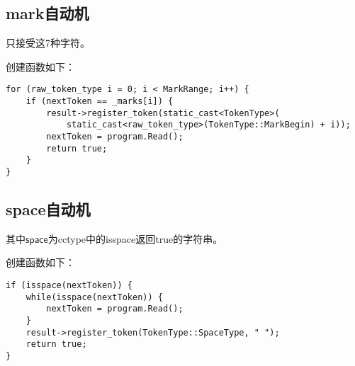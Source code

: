 \documentclass[UTF8]{ctexart}
\begin{document}
\subsection{mark自动机}
\begin{figure}[!h]
    \centering
\end{figure}
\par 只接受这7种字符。
\par 创建函数如下：
{\firacode
\begin{lstlisting}[language={[ANSI]C++}]
for (raw_token_type i = 0; i < MarkRange; i++) {
    if (nextToken == _marks[i]) {
        result->register_token(static_cast<TokenType>(
            static_cast<raw_token_type>(TokenType::MarkBegin) + i));
        nextToken = program.Read();
        return true;
    }
}
\end{lstlisting}
}

\subsection{space自动机}
\begin{figure}[!h]
    \centering
\end{figure}
\par 其中$\mathsf{space}$为cctype中的isspace返回true的字符串。
\par 创建函数如下：
{\firacode
\begin{lstlisting}[language={[ANSI]C++}]
if (isspace(nextToken)) {
    while(isspace(nextToken)) {
        nextToken = program.Read();
    }
    result->register_token(TokenType::SpaceType, " ");
    return true;
}
\end{lstlisting}
}
\end{document}
